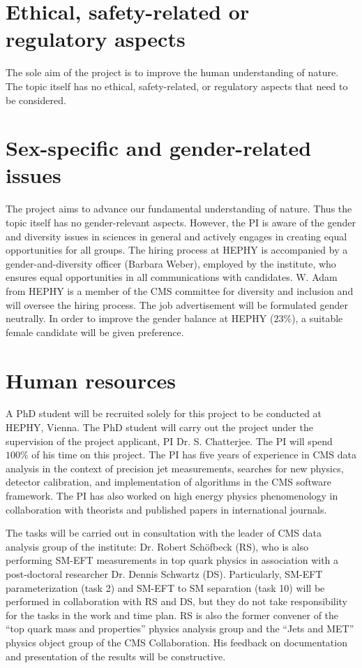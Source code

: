 \documentclass[a4paper,11pt]{article}
\begin{document}
\section{Ethical, safety-related or regulatory aspects}

The sole aim of the project is to improve the human understanding of nature. 
The topic itself has no ethical, safety-related, or regulatory aspects that need to be considered.

\section{Sex-specific and gender-related issues}\label{sec:sex}
The project aims to advance our fundamental understanding of nature. 
Thus the topic itself has no gender-relevant aspects. 
However, the PI is aware of the gender and diversity issues in sciences in general and actively engages in creating equal opportunities for all groups. 
The hiring process at HEPHY is accompanied by a gender-and-diversity officer (Barbara Weber), employed by the institute, who ensures equal opportunities in all communications with candidates. 
W. Adam from HEPHY is a member of the CMS committee for diversity and inclusion and will oversee the hiring process. 
The job advertisement will be formulated gender neutrally. 
In order to improve the gender balance at HEPHY
($23\%$), a suitable female candidate will be given preference.

\section{Human resources}

A PhD student will be recruited solely for this project to be conducted at HEPHY, Vienna. 
The PhD student will carry out the project under the supervision of the project applicant, PI Dr. S. Chatterjee. 
The PI will spend $100\%$ of his time on this project. 
The PI has five years of experience in CMS data analysis in the context of precision jet measurements, searches for new physics, detector calibration, and implementation of algorithms in the CMS software framework. 
The PI has also worked on high energy physics phenomenology in collaboration with theorists and published papers in international journals. 

The tasks will be carried out in consultation with the leader of CMS data analysis group of the institute: Dr. Robert Sch{\"o}fbeck (RS), who is also performing SM-EFT measurements in top quark physics in association with a post-doctoral researcher Dr. Dennis Schwartz (DS). 
Particularly, SM-EFT parameterization (task 2) and SM-EFT to SM separation (task 10) will be performed in collaboration with RS and DS, but they do not take responsibility for the tasks in the work and time plan.
RS is also the former convener of the ``top quark mass and properties'' physics analysis group and the ``Jets and MET'' physics object group of the CMS Collaboration. 
His feedback on documentation and presentation of the results will be constructive. %
\end{document}
